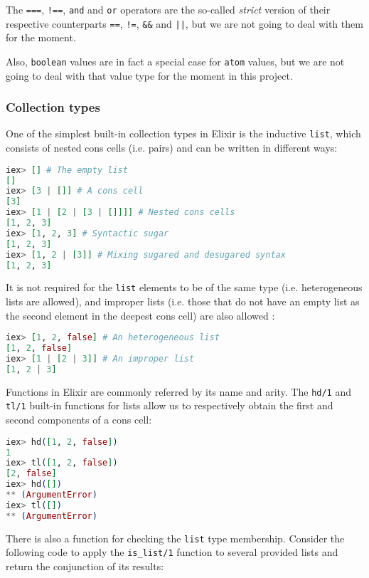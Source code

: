 The \verb|===|, \verb|!==|, \verb|and| and \verb|or| operators are the so-called
\textit{strict} version of their respective counterparts \verb|==|, \verb|!=|,
\verb|&&| and \verb+||+, but we are not going to deal with them for the moment.

Also, \verb|boolean| values are in fact a special case for \verb|atom| values,
but we are not going to deal with that value type for the moment in this
project.

\subsubsection{Collection types}

One of the simplest built-in collection types in Elixir is the inductive 
\verb|list|, which consists of nested cons cells (i.e. pairs) and can be written
in different ways:

\begin{lstlisting}[language=elixir,numbers=none,frame=none]
iex> [] # The empty list 
[] 
iex> [3 | []] # A cons cell
[3]
iex> [1 | [2 | [3 | []]]] # Nested cons cells
[1, 2, 3]
iex> [1, 2, 3] # Syntactic sugar
[1, 2, 3]
iex> [1, 2 | [3]] # Mixing sugared and desugared syntax
[1, 2, 3]
\end{lstlisting}

It is not required for the \verb|list| elements to be of the same type (i.e.
heterogeneous lists are allowed), and improper lists (i.e. those that do not
have an empty list as the second element in the deepest cons cell) are also
allowed \citep{ElixirDocs}:

\begin{lstlisting}[language=elixir,numbers=none,frame=none]
iex> [1, 2, false] # An heterogeneous list
[1, 2, false]
iex> [1 | [2 | 3]] # An improper list
[1, 2 | 3]
\end{lstlisting}

Functions in Elixir are commonly referred by its name and arity. The \verb|hd/1|
and \verb|tl/1| built-in functions for lists allow us to respectively obtain the
first and second components of a cons cell:

\begin{lstlisting}[language=elixir,numbers=none,frame=none]
iex> hd([1, 2, false])
1
iex> tl([1, 2, false])
[2, false]
iex> hd([])
** (ArgumentError)
iex> tl([])
** (ArgumentError)
\end{lstlisting}

There is also a function for checking the \verb|list| type membership. Consider
the following code to apply the \verb|is_list/1| function to several provided 
lists and return the conjunction of its results:


